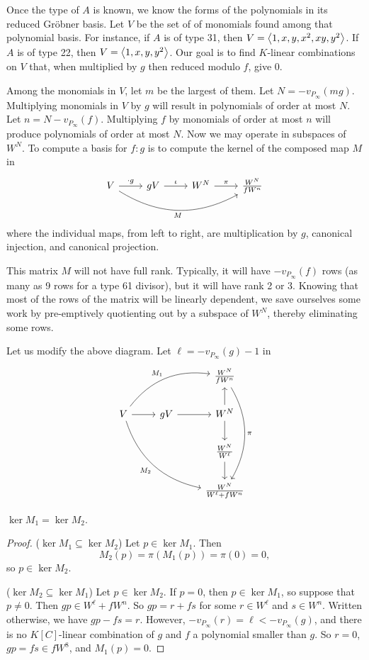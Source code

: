 Once the type of $A$ is known,
we know the forms of the polynomials in its reduced Gr\"obner basis.
Let $V$ be the set of of monomials found among that polynomial basis.
For instance, if $A$ is of type 31, then $V = \left\langle 1, x, y, x^2, xy, y^2 \right\rangle$.
If $A$ is of type 22, then $V = \left\langle 1, x, y, y^2 \right\rangle$.
Our goal is to find $K$-linear combinations on $V$ that, when multiplied by $g$ then reduced modulo $f$, give 0.

Among the monomials in $V$, let $m$ be the largest of them.
Let $N = -v_{P_\infty}(mg)$.
Multiplying monomials in $V$ by $g$ will result in polynomials of order at most $N$.
Let $n = N - v_{P_\infty}(f)$.
Multiplying $f$ by monomials of order at most $n$ will produce polynomials of order at most $N$.
Now we may operate in subspaces of $W^N$.
To compute a basis for $f : g$ is to compute the kernel of the composed map $M$ in
\[ \begin{tikzcd}
  V \arrow["\cdot g"]{r} \arrow[bend right,swap,"M"]{rrr} & gV \arrow["\iota"]{r} & W^N \arrow["\pi"]{r} & \frac{W^N}{fW^n}
\end{tikzcd} \]
where the individual maps, from left to right, are multiplication by $g$, canonical injection, and canonical projection.

This matrix $M$ will not have full rank.
Typically, it will have $-v_{P_\infty}(f)$ rows (as many as 9 rows for a type 61 divisor),
but it will have rank 2 or 3.
Knowing that most of the rows of the matrix will be linearly dependent,
we save ourselves some work by pre-emptively quotienting out by a subspace of $W^N$,
thereby eliminating some rows.

Let us modify the above diagram.
Let $\ell = -v_{P_\infty}(g) - 1$ in
\[ \begin{tikzcd}
    &    & \frac{W^N}{fW^n} \arrow[bend left,"\pi"]{ddd} \\
  V \arrow{r} \arrow[bend left,"M_1"]{rru} \arrow[bend right,swap,"M_2"]{rrdd} & gV \arrow{r} & W^N \arrow{d} \arrow{u} \\
    &    & \frac{W^N}{W^\ell} \arrow{d} \\
    &    & \frac{W^N}{W^\ell + fW^n}
\end{tikzcd} \]
\begin{lemma}
  $\ker M_1 = \ker M_2$.
\end{lemma}
\begin{proof}
  ($\ker M_1 \subseteq \ker M_2$)
  Let $p \in \ker M_1$. Then
    \[ M_2(p) = \pi(M_1(p)) = \pi(0) = 0, \]
  so $p \in \ker M_2$.

  ($\ker M_2 \subseteq \ker M_1$)
  Let $p \in \ker M_2$.
  If $p = 0$, then $p \in \ker M_1$, so suppose that $p \neq 0$.
  Then $gp \in W^\ell + fW^n$.
  So $gp = r + fs$ for some $r \in W^\ell$ and $s \in W^n$.
  Written otherwise, we have $gp - fs = r$.
  However, $-v_{P_\infty}(r) = \ell < -v_{P_\infty}(g)$, and there is no $K[C]$-linear combination of $g$ and $f$ a polynomial smaller than $g$.
  So $r = 0$, $gp = fs \in fW^8$, and $M_1(p) = 0$.
\end{proof}



